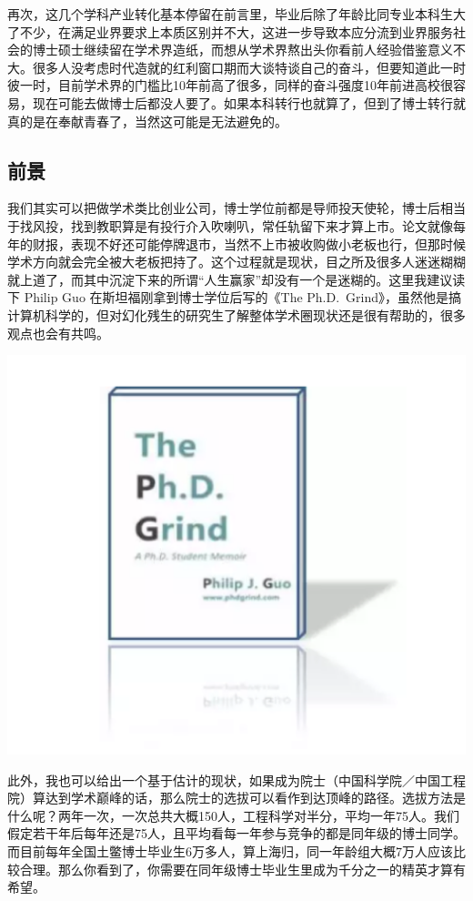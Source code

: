 \documentclass[]{book}
\begin{document}
再次，这几个学科产业转化基本停留在前言里，毕业后除了年龄比同专业本科生大了不少，在满足业界要求上本质区别并不大，这进一步导致本应分流到业界服务社会的博士硕士继续留在学术界造纸，而想从学术界熬出头你看前人经验借鉴意义不大。很多人没考虑时代造就的红利窗口期而大谈特谈自己的奋斗，但要知道此一时彼一时，目前学术界的门槛比10年前高了很多，同样的奋斗强度10年前进高校很容易，现在可能去做博士后都没人要了。如果本科转行也就算了，但到了博士转行就真的是在奉献青春了，当然这可能是无法避免的。

\subsection{前景}

我们其实可以把做学术类比创业公司，博士学位前都是导师投天使轮，博士后相当于找风投，找到教职算是有投行介入吹喇叭，常任轨留下来才算上市。论文就像每年的财报，表现不好还可能停牌退市，当然不上市被收购做小老板也行，但那时候学术方向就会完全被大老板把持了。这个过程就是现状，目之所及很多人迷迷糊糊就上道了，而其中沉淀下来的所谓``人生赢家''却没有一个是迷糊的。这里我建议读下
Philip Guo 在斯坦福刚拿到博士学位后写的《The
Ph.D.~Grind》，虽然他是搞计算机科学的，但对幻化残生的研究生了解整体学术圈现状还是很有帮助的，很多观点也会有共鸣。

\includegraphics[width=6.67in]{images/hhcs2}

此外，我也可以给出一个基于估计的现状，如果成为院士（中国科学院／中国工程院）算达到学术巅峰的话，那么院士的选拔可以看作到达顶峰的路径。选拔方法是什么呢？两年一次，一次总共大概150人，工程科学对半分，平均一年75人。我们假定若干年后每年还是75人，且平均看每一年参与竞争的都是同年级的博士同学。而目前每年全国土鳖博士毕业生6万多人，算上海归，同一年龄组大概7万人应该比较合理。那么你看到了，你需要在同年级博士毕业生里成为千分之一的精英才算有希望。
\end{document}
